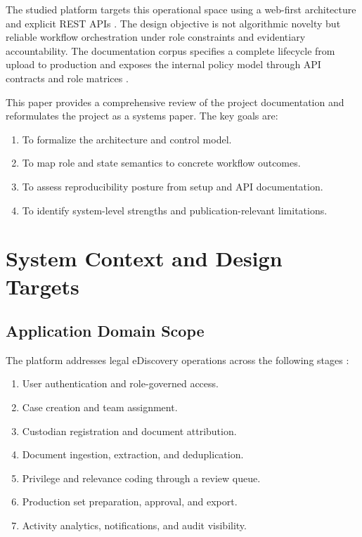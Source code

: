 \documentclass[conference]{IEEEtran}
\begin{document}
The studied platform targets this operational space using a web-first architecture and explicit REST APIs \cite{arch,api}. The design objective is not algorithmic novelty but reliable workflow orchestration under role constraints and evidentiary accountability. The documentation corpus specifies a complete lifecycle from upload to production and exposes the internal policy model through API contracts and role matrices \cite{arch,api,roles,setup}.

This paper provides a comprehensive review of the project documentation and reformulates the project as a systems paper. The key goals are:
\begin{enumerate}
\item To formalize the architecture and control model.
\item To map role and state semantics to concrete workflow outcomes.
\item To assess reproducibility posture from setup and API documentation.
\item To identify system-level strengths and publication-relevant limitations.
\end{enumerate}

\section{System Context and Design Targets}
\subsection{Application Domain Scope}
The platform addresses legal eDiscovery operations across the following stages \cite{arch,api}:
\begin{enumerate}
\item User authentication and role-governed access.
\item Case creation and team assignment.
\item Custodian registration and document attribution.
\item Document ingestion, extraction, and deduplication.
\item Privilege and relevance coding through a review queue.
\item Production set preparation, approval, and export.
\item Activity analytics, notifications, and audit visibility.
\end{enumerate}
\end{document}
